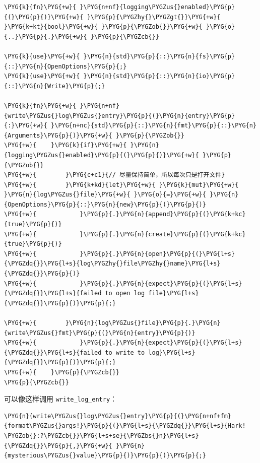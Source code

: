 \begin{Verbatim}[commandchars=\\\{\},breaklines=true,breakanywhere=true,fontsize=\codefont,xleftmargin=17bp]
\PYG{k}{fn}\PYG{+w}{ }\PYG{n+nf}{logging\PYGZus{}enabled}\PYG{p}{(}\PYG{p}{)}\PYG{+w}{ }\PYG{p}{\PYGZhy{}\PYGZgt{}}\PYG{+w}{ }\PYG{k+kt}{bool}\PYG{+w}{ }\PYG{p}{\PYGZob{}}\PYG{+w}{ }\PYG{o}{..}\PYG{p}{.}\PYG{+w}{ }\PYG{p}{\PYGZcb{}}

\PYG{k}{use}\PYG{+w}{ }\PYG{n}{std}\PYG{p}{::}\PYG{n}{fs}\PYG{p}{::}\PYG{n}{OpenOptions}\PYG{p}{;}
\PYG{k}{use}\PYG{+w}{ }\PYG{n}{std}\PYG{p}{::}\PYG{n}{io}\PYG{p}{::}\PYG{n}{Write}\PYG{p}{;}

\PYG{k}{fn}\PYG{+w}{ }\PYG{n+nf}{write\PYGZus{}log\PYGZus{}entry}\PYG{p}{(}\PYG{n}{entry}\PYG{p}{:}\PYG{+w}{ }\PYG{n+nc}{std}\PYG{p}{::}\PYG{n}{fmt}\PYG{p}{::}\PYG{n}{Arguments}\PYG{p}{)}\PYG{+w}{ }\PYG{p}{\PYGZob{}}
\PYG{+w}{    }\PYG{k}{if}\PYG{+w}{ }\PYG{n}{logging\PYGZus{}enabled}\PYG{p}{(}\PYG{p}{)}\PYG{+w}{ }\PYG{p}{\PYGZob{}}
\PYG{+w}{        }\PYG{c+c1}{// 尽量保持简单，所以每次只是打开文件}
\PYG{+w}{        }\PYG{k+kd}{let}\PYG{+w}{ }\PYG{k}{mut}\PYG{+w}{ }\PYG{n}{log\PYGZus{}file}\PYG{+w}{ }\PYG{o}{=}\PYG{+w}{ }\PYG{n}{OpenOptions}\PYG{p}{::}\PYG{n}{new}\PYG{p}{(}\PYG{p}{)}
\PYG{+w}{            }\PYG{p}{.}\PYG{n}{append}\PYG{p}{(}\PYG{k+kc}{true}\PYG{p}{)}
\PYG{+w}{            }\PYG{p}{.}\PYG{n}{create}\PYG{p}{(}\PYG{k+kc}{true}\PYG{p}{)}
\PYG{+w}{            }\PYG{p}{.}\PYG{n}{open}\PYG{p}{(}\PYG{l+s}{\PYGZdq{}}\PYG{l+s}{log\PYGZhy{}file\PYGZhy{}name}\PYG{l+s}{\PYGZdq{}}\PYG{p}{)}
\PYG{+w}{            }\PYG{p}{.}\PYG{n}{expect}\PYG{p}{(}\PYG{l+s}{\PYGZdq{}}\PYG{l+s}{failed to open log file}\PYG{l+s}{\PYGZdq{}}\PYG{p}{)}\PYG{p}{;}

\PYG{+w}{        }\PYG{n}{log\PYGZus{}file}\PYG{p}{.}\PYG{n}{write\PYGZus{}fmt}\PYG{p}{(}\PYG{n}{entry}\PYG{p}{)}
\PYG{+w}{            }\PYG{p}{.}\PYG{n}{expect}\PYG{p}{(}\PYG{l+s}{\PYGZdq{}}\PYG{l+s}{failed to write to log}\PYG{l+s}{\PYGZdq{}}\PYG{p}{)}\PYG{p}{;}
\PYG{+w}{    }\PYG{p}{\PYGZcb{}}
\PYG{p}{\PYGZcb{}}
\end{Verbatim}

可以像这样调用 \texttt{write\_log\_entry}：

\begin{Verbatim}[commandchars=\\\{\},breaklines=true,breakanywhere=true,fontsize=\codefont,xleftmargin=17bp]
\PYG{n}{write\PYGZus{}log\PYGZus{}entry}\PYG{p}{(}\PYG{n+nf+fm}{format\PYGZus{}args!}\PYG{p}{(}\PYG{l+s}{\PYGZdq{}}\PYG{l+s}{Hark! \PYGZob{}:?\PYGZcb{}}\PYG{l+s+se}{\PYGZbs{}n}\PYG{l+s}{\PYGZdq{}}\PYG{p}{,}\PYG{+w}{ }\PYG{n}{mysterious\PYGZus{}value}\PYG{p}{)}\PYG{p}{)}\PYG{p}{;}
\end{Verbatim}

